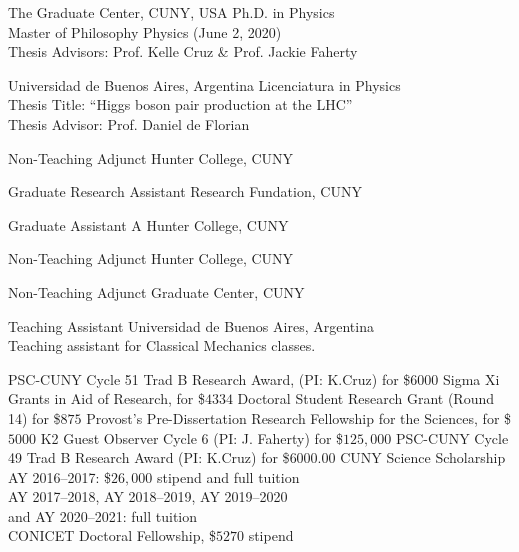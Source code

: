\documentclass[10pt]{cv}
\newcommand\tab[1][1cm]{\hspace*{#1}}
\begin{document}
\begin{llist}

The Graduate Center, CUNY, USA
Ph.D. in Physics\\
Master of Philosophy Physics (June 2, 2020)\\
Thesis Advisors: Prof. Kelle Cruz \& Prof. Jackie Faherty

Universidad de Buenos Aires, Argentina
Licenciatura in Physics\\
Thesis Title: ``Higgs boson pair production at the LHC''\\
Thesis Advisor: Prof. Daniel de Florian


Non-Teaching Adjunct
Hunter College, CUNY

Graduate Research Assistant
Research Fundation, CUNY

Graduate Assistant A
Hunter College, CUNY

Non-Teaching Adjunct
Hunter College, CUNY

Non-Teaching Adjunct
Graduate Center, CUNY

Teaching Assistant
Universidad de Buenos Aires, Argentina\\
Teaching assistant for Classical Mechanics classes.



PSC-CUNY Cycle 51 Trad B Research Award, (PI: K.Cruz) for \$$6000$
Sigma Xi Grants in Aid of Research, for \$$4334$
Doctoral Student Research Grant (Round 14) for \$$875$    
Provost’s Pre-Dissertation Research Fellowship for the Sciences, for \$$5000$
K2 Guest Observer Cycle 6 (PI: J. Faherty) for \$$125,000$
PSC-CUNY Cycle 49 Trad B Research Award (PI: K.Cruz) for \$$6000.00$
CUNY Science Scholarship
\tab AY 2016–2017: \$$26,000$ stipend and full tuition\\
\tab AY 2017–2018, AY 2018–2019, AY 2019–2020\\ 
\tab and AY 2020–2021: full tuition\\
CONICET Doctoral Fellowship, \$$5270$ stipend



\end{llist}
\end{document}
